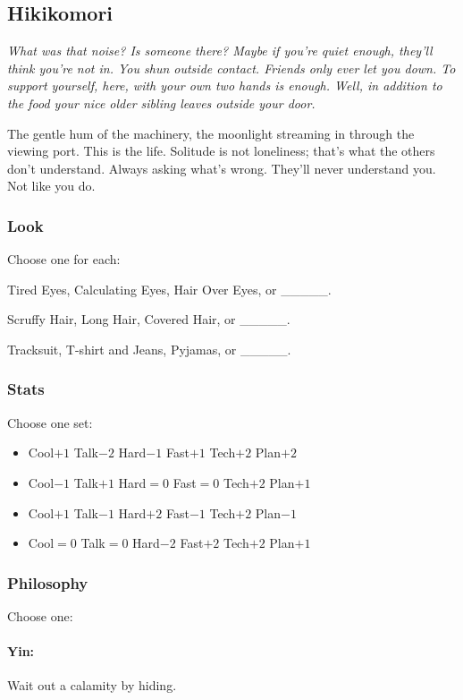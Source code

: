 \subsection{Hikikomori}
{\itshape What was that noise? Is someone there? Maybe if you're quiet
  enough, they'll think you're not in. You shun outside
  contact. Friends only ever let you down. To support yourself, here,
  with your own two hands is enough. Well, in addition to the food
  your nice older sibling leaves outside your door.

The gentle hum of the machinery, the moonlight streaming in through
the viewing port. This is the life. Solitude is not loneliness; that's
what the others don't understand. Always asking what's wrong. They'll
never understand you. Not like you do.}

\subsubsection{Look}
Choose one for each:

Tired Eyes, Calculating Eyes, Hair Over Eyes, or \_\_\_\_\_.

Scruffy Hair, Long Hair, Covered Hair, or \_\_\_\_\_.

Tracksuit, T-shirt and Jeans, Pyjamas, or \_\_\_\_\_.

\subsubsection{Stats}
Choose one set:
\begin{itemize}
\setlength\itemsep{0em}
\item Cool$+1$ Talk$-2$ Hard$-1$ Fast$+1$ Tech$+2$ Plan$+2$
\item Cool$-1$ Talk$+1$ Hard${=}0$ Fast${=}0$ Tech$+2$ Plan$+1$
\item Cool$+1$ Talk$-1$ Hard$+2$ Fast$-1$ Tech$+2$ Plan$-1$
\item Cool${=}0$ Talk${=}0$ Hard$-2$ Fast$+2$ Tech$+2$ Plan$+1$
\end{itemize}

\subsubsection{Philosophy}
Choose one:
\paragraph{Yin:} Wait out a calamity by hiding.
